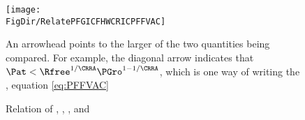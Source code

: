 \begin{figure}[ht]
  \centerline{
    \texttt{[image: \\FigDir/RelatePFGICFHWCRICPFFVAC]}
  }
  \caption{Relation of \GICRaw, \FHWC, \RIC, and \PFFVAC} \label{fig:RelatePFGICFHWCRICPFFVAC}
  \footnotesize{An arrowhead points to the larger of the two quantities being compared.  For example, the diagonal arrow indicates that $\Pat < \Rfree^{1/\CRRA}\PGro^{1-1/\CRRA}$, which is one way of writing the {\PFFVAC}, equation \eqref{eq:PFFVAC}}
\end{figure}
